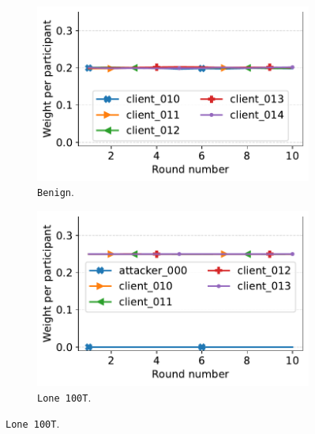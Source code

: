 \begin{figure} %
  \centering
  \begin{subfigure}[t]{0.4\linewidth}
    \centering
    \includegraphics[trim=0 0 10pt 0,clip,width=\linewidth]{figures/reput/benign_expanded.pdf}
    \caption{\footnotesize\texttt{Benign}.}
    \label{fig:reput_byzantine.benign}
  \end{subfigure}
  \qquad 
  \begin{subfigure}[t]{0.4\linewidth}
    \centering
    \includegraphics[trim=0 0 10pt 0,clip,width=\linewidth]{figures/reput/lone_loud_expanded.pdf}
    \caption{\footnotesize\texttt{Lone~100T}.}
    \label{fig:reput_byzantine.lone}
  \end{subfigure}


\end{figure}

